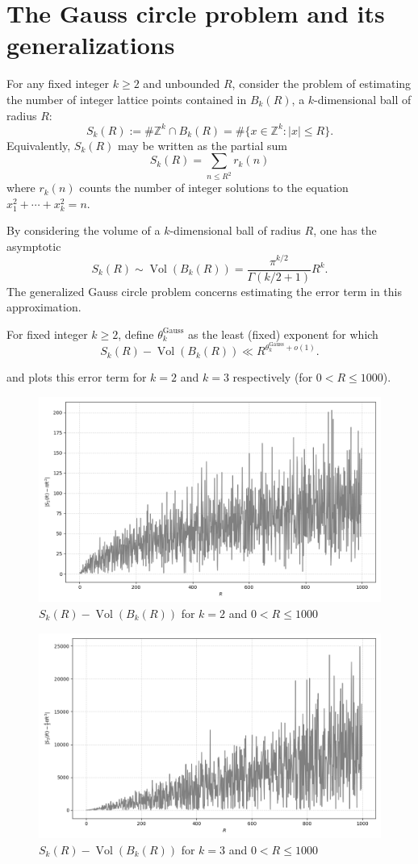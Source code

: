 \chapter{The Gauss circle problem and its generalizations}\label{gauss-circle-chapter}

\unintegrated

For any fixed integer $k \ge 2$ and unbounded $R$, consider the problem of estimating the number of integer lattice points contained in $B_k(R)$, a $k$-dimensional ball of radius $R$:
\[
S_k(R) := \# \mathbb{Z}^k \cap B_k(R) = \# \{x \in \mathbb{Z}^k: |x| \le R\}.
\]
Equivalently, $S_k(R)$ may be written as the partial sum 
\[
S_k(R) = \sum_{n \le R^{2}}r_k(n)
\]
where $r_k(n)$ counts the number of integer solutions to the equation $x_1^2 + \cdots + x_k^2 = n$.

By considering the volume of a $k$-dimensional ball of radius $R$, one has the asymptotic
\[
S_k(R) \sim \operatorname{Vol}(B_k(R)) = \frac{\pi^{k/2}}{\Gamma(k/2 + 1)}R^k.
\]
The generalized Gauss circle problem concerns estimating the error term in this approximation. 

\begin{definition}
For fixed integer $k \ge 2$, define $\theta^{\operatorname{Gauss}}_{k}$ as the least (fixed) exponent for which
\[
S_k(R) - \operatorname{Vol}(B_k(R)) \ll R^{\theta^{\operatorname{Gauss}}_{k} + o(1)}.
\]
\end{definition}

 and  plots this error term for $k = 2$ and $k = 3$ respectively (for $0 < R \le 1000$).

\begin{figure}
    \centering
    \includegraphics[width=0.5\linewidth]{chapter/gauss_circle_error_2.png}
    \caption{$S_k(R) - \operatorname{Vol}(B_k(R))$ for $k = 2$ and $0 < R \le 1000$}
    \label{fig:gauss_circle_2}
\end{figure}

\begin{figure}
    \centering
    \includegraphics[width=0.5\linewidth]{chapter/gauss_circle_error_3.png}
    \caption{$S_k(R) - \operatorname{Vol}(B_k(R))$ for $k = 3$ and $0 < R \le 1000$}
    \label{fig:gauss_circle_3}
\end{figure}



